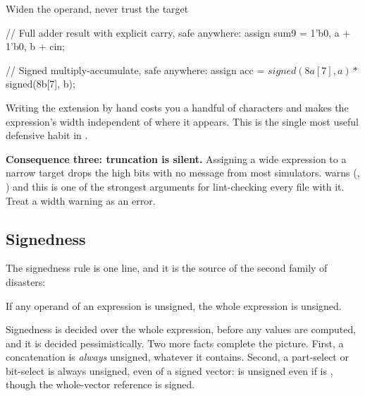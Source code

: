 \begin{tipbox}{Widen the operand, never trust the target}
\begin{svcode}
// Full adder result with explicit carry, safe anywhere:
assign sum9 = {1'b0, a} + {1'b0, b} + cin;

// Signed multiply-accumulate, safe anywhere:
assign acc = $signed({{8{a[7]}}, a}) * $signed({{8{b[7]}}, b});
\end{svcode}
Writing the extension by hand costs you a handful of characters and makes the
expression's width independent of where it appears. This is the single most
useful defensive habit in \SV{} \RTL{}.
\end{tipbox}

\textbf{Consequence three: truncation is silent.} Assigning a wide expression
to a narrow target drops the high bits with no message from most simulators.
 warns (, ) and this is one
of the strongest arguments for lint-checking every file with it. Treat a
 width warning as an error.

\subsection{Signedness}


The signedness rule is one line, and it is the source of the second family of
disasters:

\begin{ruleofthumb}
If any operand of an expression is unsigned, the whole expression is unsigned.
\end{ruleofthumb}

Signedness is decided over the whole expression, before any values are
computed, and it is decided pessimistically. Two more facts complete the
picture. First, a concatenation is \emph{always} unsigned, whatever it
contains. Second, a part-select or bit-select is always unsigned, even of a
signed vector:  is unsigned even if  is
, though the whole-vector reference  is
signed.

